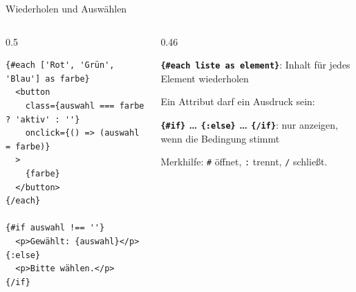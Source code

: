 \begin{frame}[fragile]{Wiederholen und Auswählen}
  \begin{columns}[onlytextwidth,t]
    \begin{column}{0.5\textwidth}
\begin{lstlisting}[style=svelte]
{#each ['Rot', 'Grün', 'Blau'] as farbe}
  <button
    class={auswahl === farbe ? 'aktiv' : ''}
    onclick={() => (auswahl = farbe)}
  >
    {farbe}
  </button>
{/each}

{#if auswahl !== ''}
  <p>Gewählt: {auswahl}</p>
{:else}
  <p>Bitte wählen.</p>
{/if}
\end{lstlisting}
    \end{column}
    \begin{column}{0.46\textwidth}
      \footnotesize
      \begin{tugitemize}
        \item[1] \textbf{\texttt{\{\#each liste as element\}}}:
              Inhalt für jedes Element wiederholen
        \item[3] Ein Attribut darf ein Ausdruck sein:
        \item[10] \textbf{\texttt{\{\#if\}} \dots{} \texttt{\{:else\}} \dots{} \texttt{\{/if\}}}:
              nur anzeigen, wenn die Bedingung stimmt
      \end{tugitemize}
      \vspace{0.4em}
      Merkhilfe: \texttt{\#} öffnet, \texttt{:} trennt, \texttt{/} schließt.
    \end{column}
  \end{columns}
\end{frame}

